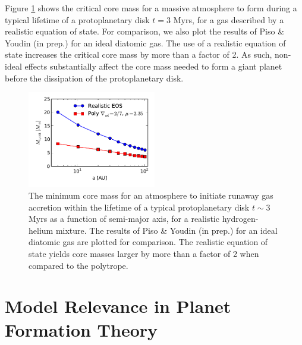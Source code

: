 \documentclass[apj]{emulateapj}
\begin{document}


Figure \ref{fig:Mvsaplot} shows the critical core mass for a massive atmosphere to form during a typical lifetime of a protoplanetary disk $t=3$ Myrs, for a gas described by a realistic equation of state. For comparison, we also plot the results of Piso \& Youdin (in prep.) for an ideal diatomic gas. The use of a realistic equation of state increases the critical core mass by more than a factor of 2. As such, non-ideal effects substantially affect the core mass needed to form a giant planet  before the dissipation of the protoplanetary disk.   

\begin{figure}[h!]
\centering
\includegraphics[width=0.5\textwidth]{../../figs/ModelAtmospheres/RadSelfGravRealEOS/Mc_vs_a_poly_real_paper.pdf}
\caption{The minimum core mass for an atmosphere to initiate runaway gas accretion within the lifetime of a typical protoplanetary disk $t \sim 3$ Myrs as a function of semi-major axis, for a realistic hydrogen-helium mixture. The results of Piso \& Youdin (in prep.) for an ideal diatomic gas are plotted for comparison. The realistic equation of state yields core masses larger by more than a factor of 2 when compared to the polytrope.}
\label{fig:Mvsaplot}
\end{figure}


\section{Model Relevance in Planet Formation Theory}
\label{acc}
\end{document}
